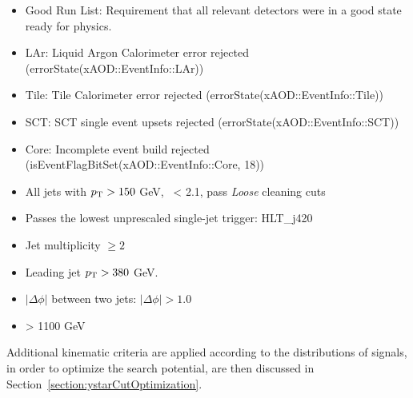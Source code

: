 \begin{itemize}
\item Good Run List: Requirement that all relevant detectors were in a good state ready for physics. 
\item LAr: Liquid Argon Calorimeter error rejected (errorState(xAOD::EventInfo::LAr))
\item Tile: Tile Calorimeter error rejected (errorState(xAOD::EventInfo::Tile))
\item SCT: SCT single event upsets rejected (errorState(xAOD::EventInfo::SCT))
\item Core: Incomplete event build rejected (isEventFlagBitSet(xAOD::EventInfo::Core, 18))
\item All jets with $p_{\mathrm{T}} > 150$ GeV,  \abseta~< 2.1, pass \textit{Loose} cleaning cuts
\item Passes the lowest unprescaled single-jet trigger: HLT\_j420
\item Jet multiplicity $\ge 2$
\item Leading jet $p_{\mathrm{T}} > 380$ GeV.
\item $|\Delta\phi|$ between two jets: $|\Delta\phi| > 1.0$
\item \mjj > 1100 GeV
\end{itemize}

Additional kinematic criteria are applied according to the distributions of signals, in order to optimize the
search potential, are then discussed in Section~\ref{section:ystarCutOptimization}.



